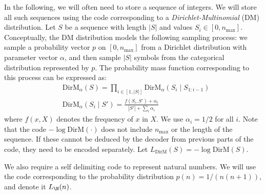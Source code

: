 In the following, we will often need to store a sequence of integers. We will store all such sequences using the code corresponding to a  \emph{Dirichlet-Multinomial} (DM) distribution. Let $S$ be a sequence with length $|S|$ and values $S_i \in [0, n_{\max}]$. Conceptually, the DM distribution models the following sampling process: we sample a probability vector $p$ on $[0, n_{\max}]$ from a Dirichlet distribution with parameter vector $\alpha$, and then sample $|S|$ symbols from the categorical distribution represented by $p$. The probability mass function corresponding to this process can be expressed as:
\begin{align*}
&\text{DirM}_\alpha(S) = \prod_{i \in [1,|S|]} \text{DirM}_\alpha(S_i\mid S_{1:i-1})  \\
&\text{DirM}_\alpha(S_i \mid S') = \frac{f(S_i, S') + \alpha_i}{|S'| + \sum_i \alpha_i}
\end{align*}
where $f(x, X)$ denotes the frequency of $x$ in $X$. We use $\alpha_i = 1/2$ for all $i$. Note that the code $- \log \text{DirM}(\cdot)$ does not include $n_{\max}$ or the length of the sequence. If these cannot be deduced by the decoder from previous parts of the code, they need to be encoded separately. Let $L_\text{DirM}(S) = -\log \text{DirM}(S)$.

We also require a self delimiting code to represent natural numbers. We will use the code corresponding to the probability distribution $p(n) = 1/ (n(n+1))$, and denote it $L_\N(n)$.

